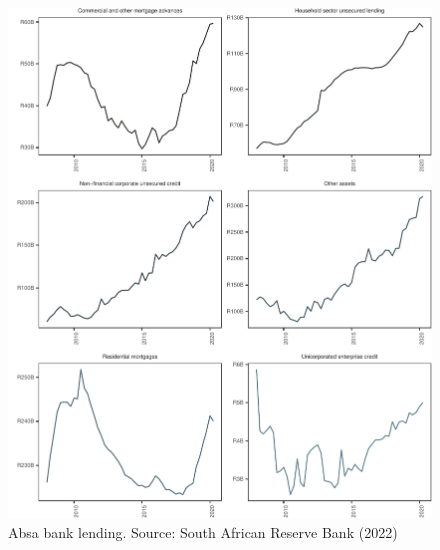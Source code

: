 \documentclass[
]{article}
\begin{document}
\begin{figure}[H]

\includegraphics{Bank_capital_and_bank_lending_files/figure-latex/ba900absa-1} \hfill{}

\caption{Absa bank lending. Source: South African Reserve Bank (2022) }\label{fig:ba900absa}
\end{figure}
\end{document}

